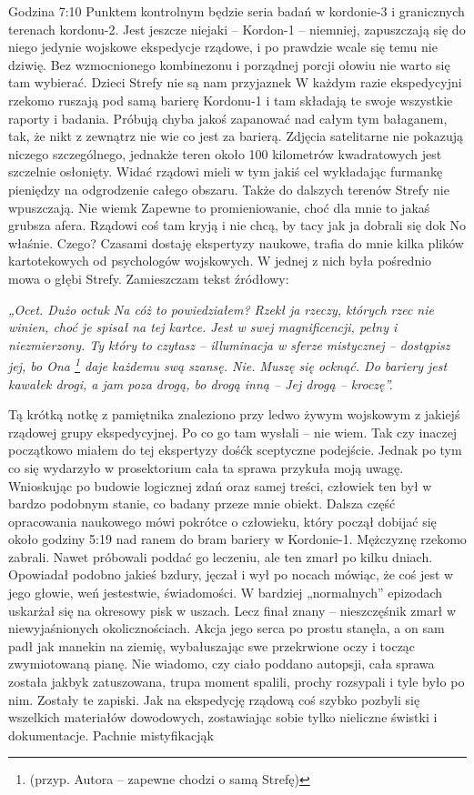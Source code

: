 \documentclass[../MAIN.tex]{subfiles}
\begin{document}
Godzina 7:10
Punktem kontrolnym będzie seria badań w kordonie-3 i
granicznych terenach kordonu-2. Jest jeszcze niejaki – Kordon-1
– niemniej, zapuszczają się do niego jedynie wojskowe
ekspedycje rządowe, i po prawdzie wcale się temu nie dziwię.
Bez wzmocnionego kombinezonu i porządnej porcji ołowiu nie
warto się tam wybierać. Dzieci Strefy nie są nam przyjazne\3k W
każdym razie ekspedycyjni rzekomo ruszają pod samą barierę
Kordonu-1 i tam składają te swoje wszystkie raporty i badania.
Próbują chyba jakoś zapanować nad całym tym bałaganem, tak, że
nikt z zewnątrz nie wie co jest za barierą. Zdjęcia satelitarne
nie pokazują niczego szczególnego, jednakże teren około 100
kilometrów kwadratowych jest szczelnie osłonięty. Widać rządowi
mieli w tym jakiś cel wykładając furmankę pieniędzy na
odgrodzenie całego obszaru. Także do dalszych terenów Strefy
nie wpuszczają. Nie wiem\3k Zapewne to promieniowanie, choć dla
mnie to jakaś grubsza afera. Rządowi coś tam kryją i nie chcą,
by tacy jak ja dobrali się do\3k No właśnie. Czego? Czasami
dostaję ekspertyzy naukowe, trafia do mnie kilka plików
kartotekowych od psychologów wojskowych. W jednej z nich była
pośrednio mowa o głębi Strefy. Zamieszczam tekst źródłowy:

\textit{„Ocet. Dużo octu\3k Na cóż to powiedziałem? Rzekł ja
rzeczy,
których rzec nie winien, choć je spisał na tej kartce. Jest w
swej magnificencji, pełny i niezmierzony. Ty który to czytasz –
illuminacja w sferze mistycznej – dostąpisz jej, bo Ona
\footnote{(przyp.
Autora – zapewne chodzi o samą Strefę)} daje
każdemu swą szansę.
Nie. Muszę się ocknąć. Do bariery jest kawałek drogi, a jam
poza drogą, bo drogą inną – Jej drogą – kroczę”.}

Tą krótką notkę z pamiętnika znaleziono przy ledwo żywym
wojskowym z jakiejś rządowej grupy ekspedycyjnej. Po co go tam
wysłali – nie wiem. Tak czy inaczej początkowo miałem do tej
ekspertyzy dość\3k sceptyczne podejście. Jednak po tym co się
wydarzyło w prosektorium cała ta sprawa przykuła moją uwagę.
Wnioskując po budowie logicznej zdań oraz samej treści,
człowiek ten był w bardzo podobnym stanie, co badany przeze
mnie obiekt. Dalsza część opracowania naukowego mówi pokrótce o
człowieku, który począł dobijać się około godziny 5:19 nad
ranem do bram bariery w Kordonie-1. Mężczyznę rzekomo zabrali.
Nawet próbowali poddać go leczeniu, ale ten zmarł po kilku
dniach. Opowiadał podobno jakieś bzdury, jęczał i wył po nocach
mówiąc, że coś jest w jego głowie, weń jestestwie, świadomości.
W bardziej „normalnych” epizodach uskarżał się na okresowy pisk
w uszach. Lecz finał znany – nieszczęśnik zmarł w
niewyjaśnionych okolicznościach. Akcja jego serca po prostu
stanęła, a on sam padł jak manekin na ziemię, wybałuszając swe
przekrwione oczy i tocząc zwymiotowaną pianę. Nie wiadomo, czy
ciało poddano autopsji, cała sprawa została jakby\3k
zatuszowana, trupa moment spalili, prochy rozsypali i tyle było
po nim. Zostały te zapiski. Jak na ekspedycję rządową coś
szybko pozbyli się wszelkich materiałów dowodowych, zostawiając
sobie tylko nieliczne świstki i dokumentacje. Pachnie
mistyfikacją\3k
\end{document}
